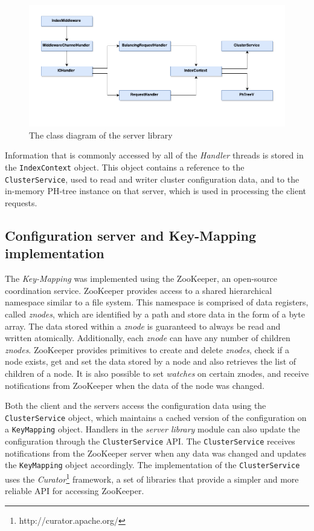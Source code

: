 \documentclass[11pt,a4paper]{globis-book}
\begin{document}
\begin{figure}[h]
    \centering 
    \includegraphics[scale=1]{images/Server}
    \caption{The class diagram of the server library}
    \label{fig:Server-library}
\end{figure}

Information that is commonly accessed by all of the \textit{Handler} threads is stored in the \texttt{IndexContext} object. This object contains a reference to the \texttt{ClusterService}, used to read and writer cluster configuration data, and to the in-memory PH-tree instance on that server, which is used in processing the client requests. 

\subsection{Configuration server and Key-Mapping implementation}

The \textit{Key-Mapping} was implemented using the ZooKeeper, an open-source coordination service. ZooKeeper provides access to a shared hierarchical namespace similar to a file system. This namespace is comprised of data registers, called \textit{znodes}, which are identified by a path and store data in the form of a byte array. The data stored within a \textit{znode} is guaranteed to always be read and written atomically. Additionally, each \textit{znode} can have any number of children \textit{znodes}. ZooKeeper provides primitives to create and delete \textit{znodes}, check if a node exists, get and set the data stored by a node and also retrieves the list of children of a node. It is also possible to set \textit{watches} on certain znodes, and receive notifications from ZooKeeper when the data of the node was changed. 

Both the client and the servers access the configuration data using the \texttt{ClusterService} object, which maintains a cached version of the configuration on a \texttt{KeyMapping} object. Handlers in the \textit{server library} module can also update the configuration through the \texttt{ClusterService} API. The \texttt{ClusterService} receives notifications from the ZooKeeper server when any data was changed and updates the \texttt{KeyMapping} object accordingly. The implementation of the \texttt{ClusterService} uses the \textit{Curator}\footnote{http://curator.apache.org/} framework, a set of libraries that provide a simpler and more reliable API for accessing ZooKeeper. 
\end{document}
